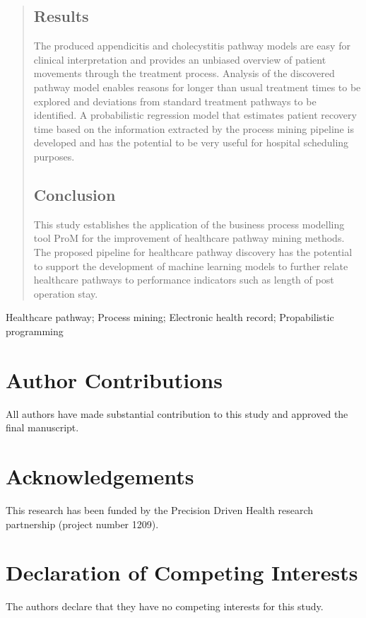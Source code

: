 \documentclass{elsarticle}
\begin{document}
\begin{frontmatter}
\begin{abstract}
\subsection*{Results}
The produced appendicitis and cholecystitis 
pathway models are
easy for clinical interpretation and provides an unbiased overview of patient movements through the treatment process. Analysis of the discovered pathway model enables reasons for longer than usual treatment times to be explored and deviations from standard treatment pathways to be identified. A probabilistic regression model that estimates patient recovery time based on the information extracted by the process mining pipeline is developed and has the potential to be very useful for hospital scheduling purposes.

\subsection*{Conclusion}
This study establishes the application of the business process modelling tool ProM for the improvement of healthcare pathway mining methods. 
The proposed pipeline for healthcare pathway discovery  has the potential to support the development of machine learning models to further relate healthcare pathways to performance indicators such as length of post operation stay. 

\end{abstract}

\begin{keyword}
Healthcare pathway; Process mining; Electronic health record; Propabilistic programming
\end{keyword}

\end{frontmatter}

\linenumbers



\section*{Author Contributions}
All authors have made substantial contribution to this study and approved the final manuscript.

\section*{Acknowledgements}
This research has been funded by the Precision Driven Health research partnership (project number 1209).

\section*{Declaration of Competing Interests}
The authors declare that they have no competing interests for this study.



\begin{appendix}

\end{appendix}
\end{document}
